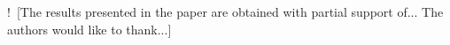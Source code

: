 \documentclass[conference]{IEEEtran}
\newcommand{\nnn}[2][ncolor]{\noindent%
\textcolor{eclr}{!\ [}\textcolor{#1}{#2}\textcolor{eclr}{]}}
\begin{document}
\nnn{The results presented in the paper are obtained with partial support of...
The authors would like to thank...}










%
%
%
\end{document}
